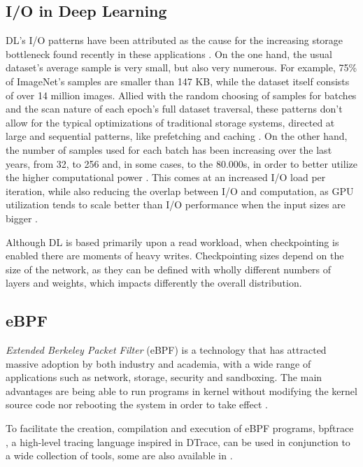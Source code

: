 \documentclass[conference]{IEEEtran}
\begin{document}
\subsection{I/O in Deep Learning}

DL's I/O patterns have been attributed as the cause for the increasing storage bottleneck found recently in these applications \cite{beegfs}. On the one hand, the usual dataset's average sample is very small, but also very numerous. For example, 75\% of ImageNet's samples are smaller than 147 KB, while the dataset itself consists of over 14 million images. Allied with the random choosing of samples for batches and the scan nature of each epoch's full dataset traversal, these patterns don't allow for the typical optimizations of traditional storage systems, directed at large and sequential patterns, like prefetching and caching \cite{initial}. On the other hand, the number of samples used for each batch has been increasing over the last years, from 32, to 256 and, in some cases, to the 80.000s, in order to better utilize the higher computational power \cite{nvme}. This comes at an increased I/O load per iteration, while also reducing the overlap between I/O and computation, as GPU utilization tends to scale better than I/O performance when the input sizes are bigger \cite{TFbenchmark}. 

Although DL is based primarily upon a read workload, when checkpointing is enabled there are moments of heavy writes. Checkpointing sizes depend on the size of the network, as they can be defined with wholly different numbers of layers and weights, which impacts differently the overall distribution.

\subsection{eBPF}

\textit{Extended Berkeley Packet Filter} (eBPF) is a technology that has attracted massive adoption by both industry and academia, with a wide range of applications such as network, storage, security and sandboxing.
The main advantages are being able to run programs in kernel without modifying the kernel source code nor rebooting the system in order to take effect \cite{eBPFSurvey}.

To facilitate the creation, compilation and execution of eBPF programs, bpftrace \cite{bpftrace}, a high-level tracing language inspired in DTrace, can be used in conjunction to a wide collection of tools, some are also available in \cite{bgreggBook}.
\end{document}
